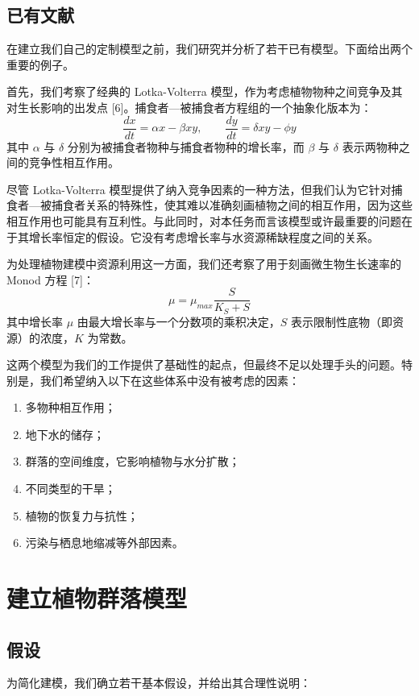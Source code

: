 \documentclass[11pt,a4paper]{ctexart}
\begin{document}
\subsection{已有文献}

在建立我们自己的定制模型之前，我们研究并分析了若干已有模型。下面给出两个重要的例子。

首先，我们考察了经典的 Lotka-Volterra 模型，作为考虑植物物种之间竞争及其对生长影响的出发点 [6]。捕食者—被捕食者方程组的一个抽象化版本为：
\[
\frac{dx}{dt} = \alpha x - \beta xy , \qquad \frac{dy}{dt} = \delta xy - \phi y
\]
其中 $\alpha$ 与 $\delta$ 分别为被捕食者物种与捕食者物种的增长率，而 $\beta$ 与 $\delta$ 表示两物种之间的竞争性相互作用。

尽管 Lotka-Volterra 模型提供了纳入竞争因素的一种方法，但我们认为它针对捕食者—被捕食者关系的特殊性，使其难以准确刻画植物之间的相互作用，因为这些相互作用也可能具有互利性。与此同时，对本任务而言该模型或许最重要的问题在于其增长率恒定的假设。它没有考虑增长率与水资源稀缺程度之间的关系。

为处理植物建模中资源利用这一方面，我们还考察了用于刻画微生物生长速率的 Monod 方程 [7]：
\[
\mu = \mu_{max}\frac{S}{K_S + S}
\]
其中增长率 $\mu$ 由最大增长率与一个分数项的乘积决定，$S$ 表示限制性底物（即资源）的浓度，$K$ 为常数。

这两个模型为我们的工作提供了基础性的起点，但最终不足以处理手头的问题。特别是，我们希望纳入以下在这些体系中没有被考虑的因素：

\begin{enumerate}
\item 多物种相互作用；
\item 地下水的储存；
\item 群落的空间维度，它影响植物与水分扩散；
\item 不同类型的干旱；
\item 植物的恢复力与抗性；
\item 污染与栖息地缩减等外部因素。
\end{enumerate}

\section{建立植物群落模型}

\subsection{假设}

为简化建模，我们确立若干基本假设，并给出其合理性说明：
\end{document}
